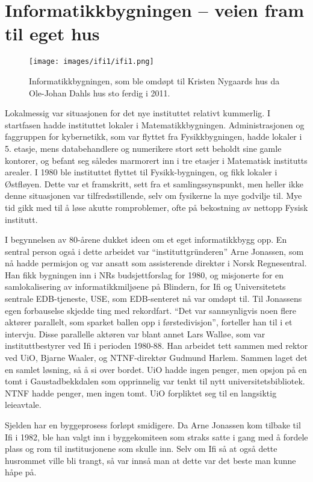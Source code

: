 \chapter[Ifi 1]{Informatikkbygningen – veien fram til eget hus}

\author{Skrevet av Narve Trædal}

\begin{figure}
	\texttt{[image: images/ifi1/ifi1.png]}
	\caption{Informatikkbygningen, som ble omdøpt til Kristen Nygaards hus da Ole-Johan Dahls hus sto ferdig i 2011.}
\end{figure}

Lokalmessig var situasjonen for det nye instituttet relativt kummerlig. I startfasen hadde instituttet lokaler i Matematikkbygningen. Administrasjonen og faggruppen for kybernetikk, som var flyttet fra Fysikkbygningen, hadde lokaler i 5. etasje, mens databehandlere og numerikere stort sett beholdt sine gamle kontorer, og befant seg således marmorert inn i tre etasjer i Matematisk institutts arealer. I 1980 ble instituttet flyttet til Fysikk-bygningen, og fikk lokaler i Østfløyen. Dette var et framskritt, sett fra et samlingssynspunkt, men heller ikke denne situasjonen var tilfredsstillende, selv om fysikerne la mye godvilje til. Mye tid gikk med til å løse akutte romproblemer, ofte på bekostning av nettopp Fysisk institutt.

I begynnelsen av 80-årene dukket ideen om et eget informatikkbygg opp. En sentral person også i dette arbeidet var ``instituttgründeren'' Arne Jonassen, som nå hadde permisjon og var ansatt som assisterende direktør i Norsk Regnesentral. Han fikk bygningen inn i NRs budsjettforslag for 1980, og misjonerte for en samlokalisering av informatikkmiljøene på Blindern, for Ifi og Universitetets sentrale EDB-tjeneste, USE, som EDB-senteret nå var omdøpt til. Til Jonassens egen forbauselse skjedde ting med rekordfart. ``Det var sannsynligvis noen flere aktører parallelt, som sparket ballen opp i førstedivisjon'', forteller han til i et intervju. Disse parallelle aktøren var blant annet Lars Walløe, som var instituttbestyrer ved Ifi i perioden 1980-88. Han arbeidet tett sammen med rektor ved UiO, Bjarne Waaler, og NTNF-direktør Gudmund Harlem. Sammen laget det en samlet løsning, så å si over bordet. UiO hadde ingen penger, men opsjon på en tomt i Gaustadbekkdalen som opprinnelig var tenkt til nytt universitetsbibliotek. NTNF hadde penger, men ingen tomt. UiO forpliktet seg til en langsiktig leieavtale.

Sjelden har en byggeprosess forløpt smidigere. Da Arne Jonassen kom tilbake til Ifi i 1982, ble han valgt inn i byggekomiteen som straks satte i gang med å fordele plass og rom til institusjonene som skulle inn. Selv om Ifi så at også dette husrommet ville bli trangt, så var innså man at dette var det beste man kunne håpe på.

